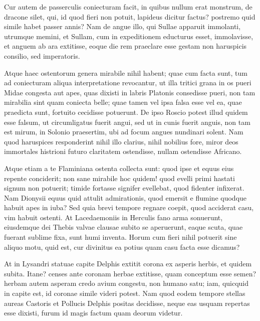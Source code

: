  Cur autem de passerculis coniecturam facit, in quibus nullum erat monstrum, de dracone silet, qui, id quod fieri non potuit, lapideus dicitur factus? postremo quid simile habet passer annis? Nam de angue illo, qui Sullae apparuit immolanti, utrumque memini, et Sullam, cum in expeditionem educturus esset, immolavisse, et anguem ab ara extitisse, eoque die rem praeclare esse gestam non haruspicis consilio, sed imperatoris.

 Atque haec ostentorum genera mirabile nihil habent; quae cum facta sunt, tum ad coniecturam aliqua interpretatione revocantur, ut illa tritici grana in os pueri Midae congesta aut apes, quas dixisti in labris Platonis consedisse pueri, non tam mirabilia sint quam coniecta belle; quae tamen vel ipsa falsa esse vel ea, quae praedicta sunt, fortuito cecidisse potuerunt. De ipso Roscio potest illud quidem esse falsum, ut circumligatus fuerit angui, sed ut in cunis fuerit anguis, non tam est mirum, in Solonio praesertim, ubi ad focum angues nundinari solent. Nam quod haruspices responderint nihil illo clarius, nihil nobilius fore, miror deos immortales histrioni futuro claritatem ostendisse, nullam ostendisse Africano.

 Atque etiam a te Flaminiana ostenta collecta sunt: quod ipse et equus eius repente conciderit; non sane mirabile hoc quidem! quod evelli primi hastati signum non potuerit; timide fortasse signifer evellebat, quod fidenter infixerat. Nam Dionysii equus quid attulit admirationis, quod emersit e flumine quodque habuit apes in iuba? Sed quia brevi tempore regnare coepit, quod acciderat casu, vim habuit ostenti. At Lacedaemoniis in Herculis fano arma sonuerunt, eiusdemque dei Thebis valvae clausae subito se aperuerunt, eaque scuta, quae fuerant sublime fixa, sunt humi inventa. Horum cum fieri nihil potuerit sine aliquo motu, quid est, cur divinitus ea potius quam casu facta esse dicamus?

 At in Lysandri statuae capite Delphis extitit corona ex asperis herbis, et quidem subita. Itane? censes ante coronam herbae extitisse, quam conceptum esse semen? herbam autem asperam credo avium congestu, non humano satu; iam, quicquid in capite est, id coronae simile videri potest. Nam quod eodem tempore stellas aureas Castoris et Pollucis Delphis positas decidisse, neque eas usquam repertas esse dixisti, furum id magis factum quam deorum videtur.

